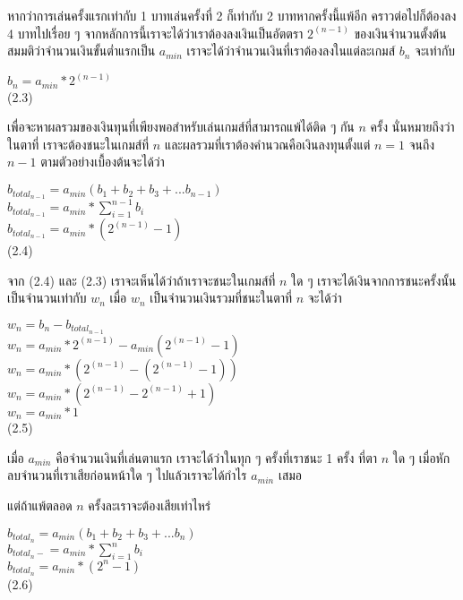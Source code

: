 \documentclass[12pt]{article}
\begin{document}
หากว่าการเล่นครั้งแรกเท่ากับ 1 บาทเล่นครั้งที่ 2 ก็เท่ากับ 2 บาทหากครั้งนี้แพ้อีก คราวต่อไปก็ต้องลง 4 บาทไปเรื่อย ๆ จากหลักการนี้เราจะได้ว่าเราต้องลงเงินเป็นอัตตรา $2^{(n-1)}$ ของเงินจำนวนตั้งต้น สมมติว่าจำนวนเงินขั้นต่ำแรกเป็น $a_{min}$ เราจะได้ว่าจำนวนเงินที่เราต้องลงในแต่ละเกมส์ $b_n$ จะเท่ากับ\\
\begin{center}
$b_n=a_{min}*2^{(n-1)}$\\
(2.3)
\end{center}
เพื่อจะหาผลรวมของเงินทุนที่เพียงพอสำหรับเล่นเกมส์ที่สามารถแพ้ได้ติด ๆ กัน $n$ ครั้ง นั่นหมายถึงว่าในตาที่ เราจะต้องชนะในเกมส์ที่ $n$ และผลรวมที่เราต้องคำนวณคือเงินลงทุนตั้งแต่ $n=1$ จนถึง $n-1$ ตามตัวอย่างเบื้องต้นจะได้ว่า
\begin{center}
$b_{total_{n-1}}=a_{min}(b_1+b_2+b_3+...b_{n-1})$\\
$b_{total_{n-1}} = a_{min} * \sum^{n-1}_{i=1}b_i$\\
$b_{total_{n-1}} = a_{min} * (2^{(n-1)}-1)$\\
(2.4)
\end{center}
จาก (2.4) และ (2.3) เราจะเห็นได้ว่าถ้าเราจะชนะในเกมส์ที่ $n$ ใด ๆ เราจะได้เงินจากการชนะครั้งนั้นเป็นจำนวนเท่ากับ $w_n$ เมื่อ $w_n$ เป็นจำนวนเงินรวมที่ชนะในตาที่ $n$ จะได้ว่า
\begin{center}
$w_n=b_n - b_{total_{n-1}}$\\
$w_n=a_{min}*2^{(n-1)} - a_{min}(2^{(n-1)}-1)$\\
$w_n=a_{min}*(2^{(n-1)}-(2^{(n-1)}-1))$\\
$w_n=a_{min}*(2^{(n-1)}-2^{(n-1)}+1)$\\
$w_n=a_{min}*1$\\
(2.5)
\end{center}
เมื่อ $a_{min}$ คือจำนวนเงินที่เล่นตาแรก เราจะได้ว่าในทุก ๆ ครั้งที่เราชนะ 1 ครั้ง ที่ตา $n$ ใด ๆ เมื่อหักลบจำนวนที่เราเสียก่อนหน้าใด ๆ ไปแล้วเราจะได้กำไร $a_{min}$ เสมอ 

แต่ถ้าแพ้ตลอด $n$ ครั้งละเราจะต้องเสียเท่าไหร่
\begin{center}
$b_{total_n}=a_{min}(b_1+b_2+b_3+...b_n)$\\
$b_{total_n-} = a_{min} * \sum^n_{i=1}b_i$\\
$b_{total_n} = a_{min} * (2^n-1)$\\
(2.6)
\end{center}
\end{document}
